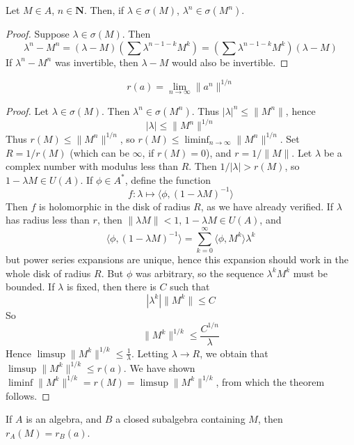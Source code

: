 \begin{lemma}
    Let $M \in A$, $n \in \mathbf{N}$. Then, if $\lambda \in \sigma(M)$, $\lambda^n \in \sigma(M^n)$.
\end{lemma}
\begin{proof}
    Suppose $\lambda \in \sigma(M)$. Then
    \[ \lambda^n - M^n = (\lambda - M) \left(\sum \lambda^{n-1-k} M^k \right) = \left(\sum \lambda^{n-1-k} M^k \right) (\lambda - M) \]
    If $\lambda^n - M^n$ was invertible, then $\lambda - M$ would also be invertible.
\end{proof}

\begin{theorem}
    \[ r(a) = \lim_{n \to \infty} \| a^n \|^{1/n} \]
\end{theorem}
\begin{proof}
    Let $\lambda \in \sigma(M)$. Then $\lambda^n \in \sigma(M^n)$. Thus $|\lambda|^n \leq \| M^n \|$, hence
    \[ |\lambda| \leq \| M^n \|^{1/n} \]
    Thus $r(M) \leq \| M^n \|^{1/n}$, so $r(M) \leq \liminf_{n \to \infty} \| M^n \|^{1/n}$. Set $R = 1/r(M)$ (which can be $\infty$, if $r(M) = 0$), and $r = 1/\|M\|$. Let $\lambda$ be a complex number with modulus less than $R$. Then $1/|\lambda| > r(M)$, so $1 - \lambda M \in U(A)$. If $\phi \in A^*$, define the function
    \[ f: \lambda \mapsto \langle \phi, (1 - \lambda M)^{-1} \rangle \]
    Then $f$ is holomorphic in the disk of radius $R$, as we have already verified. If $\lambda$ has radius less than $r$, then $\| \lambda M \| < 1$, $1 - \lambda M \in U(A)$, and
    \[ \langle \phi, (1 - \lambda M)^{-1} \rangle = \sum_{k = 0}^\infty \langle \phi, M^k \rangle \lambda^k \]
    but power series expansions are unique, hence this expansion should work in the whole disk of radius $R$. But $\phi$ was arbitrary, so the sequence $\lambda^k M^k$ must be bounded. If $\lambda$ is fixed, then there is $C$ such that
    \[ |\lambda^k| \|M^k\| \leq C \]
    So
    \[ \|M^k\|^{1/k} \leq \frac{C^{1/n}}{\lambda} \]
    Hence $\limsup \|M^k\|^{1/k} \leq \frac{1}{\lambda}$. Letting $\lambda \to R$, we obtain that $\limsup \|M^k\|^{1/k} \leq r(a)$. We have shown $\liminf \|M^k\|^{1/k} = r(M) = \limsup \|M^k\|^{1/k}$, from which the theorem follows.
\end{proof}

\begin{corollary}
    If $A$ is an algebra, and $B$ a closed subalgebra containing $M$, then $r_{A}(M) = r_B(a)$.
\end{corollary}

